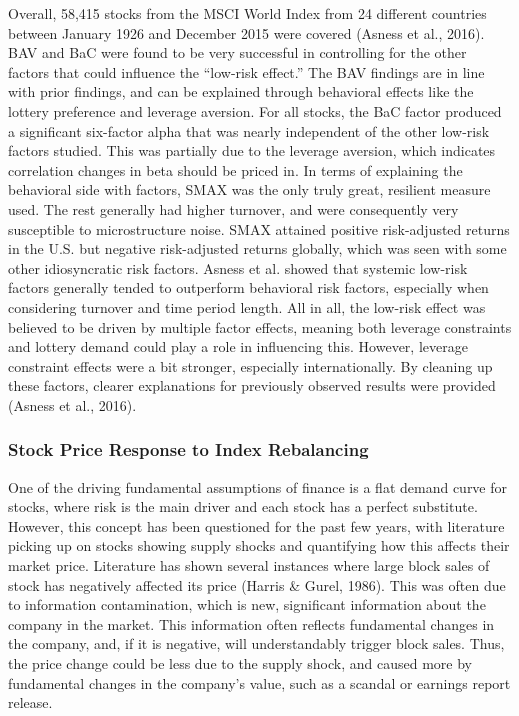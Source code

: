 \documentclass[12pt,twoside]{reedthesis}
\theoremstyle{definition}
\theoremstyle{definition}
\theoremstyle{definition}
\theoremstyle{remark}
\begin{document}
Overall, 58,415 stocks from the MSCI World Index from 24 different
countries between January 1926 and December 2015 were covered (Asness et
al., 2016). BAV and BaC were found to be very successful in controlling
for the other factors that could influence the ``low-risk effect.'' The
BAV findings are in line with prior findings, and can be explained
through behavioral effects like the lottery preference and leverage
aversion. For all stocks, the BaC factor produced a significant
six-factor alpha that was nearly independent of the other low-risk
factors studied. This was partially due to the leverage aversion, which
indicates correlation changes in beta should be priced in. In terms of
explaining the behavioral side with factors, SMAX was the only truly
great, resilient measure used. The rest generally had higher turnover,
and were consequently very susceptible to microstructure noise. SMAX
attained positive risk-adjusted returns in the U.S. but negative
risk-adjusted returns globally, which was seen with some other
idiosyncratic risk factors. Asness et al. showed that systemic low-risk
factors generally tended to outperform behavioral risk factors,
especially when considering turnover and time period length. All in all,
the low-risk effect was believed to be driven by multiple factor
effects, meaning both leverage constraints and lottery demand could play
a role in influencing this. However, leverage constraint effects were a
bit stronger, especially internationally. By cleaning up these factors,
clearer explanations for previously observed results were provided
(Asness et al., 2016).

\subsubsection{Stock Price Response to Index
Rebalancing}\label{stock-price-response-to-index-rebalancing}

One of the driving fundamental assumptions of finance is a flat demand
curve for stocks, where risk is the main driver and each stock has a
perfect substitute. However, this concept has been questioned for the
past few years, with literature picking up on stocks showing supply
shocks and quantifying how this affects their market price. Literature
has shown several instances where large block sales of stock has
negatively affected its price (Harris \& Gurel, 1986). This was often
due to information contamination, which is new, significant information
about the company in the market. This information often reflects
fundamental changes in the company, and, if it is negative, will
understandably trigger block sales. Thus, the price change could be less
due to the supply shock, and caused more by fundamental changes in the
company's value, such as a scandal or earnings report release.
\end{document}
